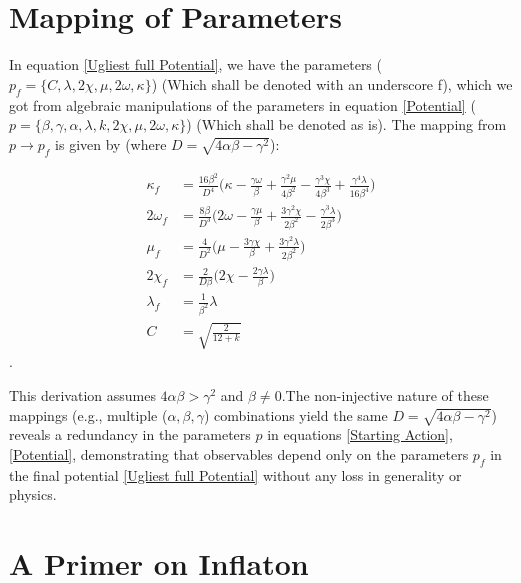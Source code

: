\documentclass[aps,prd,reprint,preprintnumbers,showpacs,floatfix,nofootinbib,superscript address]{revtex4-2}
\begin{document}
\section{Mapping of Parameters} \label{Mapping of Parameters}
In equation \cref{Ugliest full Potential}, we have the parameters ($p_f = \{C,\lambda, 2\chi, \mu, 2\omega,  \kappa \}$) (Which shall be denoted with an underscore f), which we got from algebraic manipulations of the parameters in equation \cref{Potential} ($p = \{\beta,\gamma,\alpha,\lambda, k, 2\chi, \mu, 2\omega,  \kappa \}$) (Which shall be denoted as is). The mapping from $p \rightarrow p_f$ is given by (where $D = \sqrt{4\alpha \beta- \gamma^2}$):

\begin{align}
    \kappa_f &= \frac{16\beta^2}{D^4}\Big(\kappa - \frac{\gamma\omega}{\beta} + \frac{\gamma^2\mu}{4\beta^2} - \frac{\gamma^3\chi}{4\beta^3} +\frac{\gamma^4\lambda}{16\beta^4} \Big)   \nonumber \\
    2\omega_f &= \frac{8\beta}{D^3} \Big(2\omega - \frac{\gamma\mu}{\beta} + \frac{3\gamma^2\chi}{2\beta^2} - \frac{\gamma^3\lambda}{2\beta^3}\Big)   \nonumber \\
    \mu_f &= \frac{4}{D^2} \Big(\mu - \frac{3\gamma\chi}{\beta} + \frac{3\gamma^2\lambda}{2\beta^2} \Big) \nonumber \\
    2\chi_f &= \frac{2}{D\beta} \Big(2\chi - \frac{2\gamma\lambda}{\beta}\Big) \nonumber \\
    \lambda_f &= \frac{1}{\beta^2}\lambda \nonumber \\
    C &= \sqrt{\frac{2}{12+k}}
\end{align}.

This derivation assumes $4\alpha\beta > \gamma^2$ and $\beta \neq 0. $The non-injective nature of these mappings (e.g., multiple ($\alpha,\beta,\gamma$) combinations yield the same $D = \sqrt{4\alpha\beta - \gamma^2}$) reveals a redundancy in the parameters $p$ in equations \cref{Starting Action}, \cref{Potential}, demonstrating that observables depend only on the parameters $p_f$ in the final potential \cref{Ugliest full Potential} without any loss in generality or physics. 


\section{A Primer on Inflaton}\label{The need for Inflation}
\end{document}
